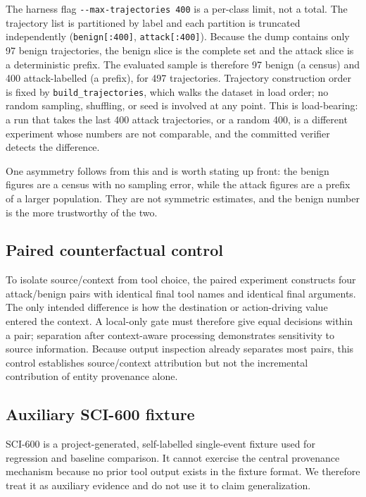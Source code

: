 \documentclass[letterpaper,twocolumn,10pt]{article}
\begin{document}
The harness flag \texttt{-{}-max-trajectories 400} is a per-class limit, not a
total. The trajectory list is partitioned by label and each partition is
truncated independently (\texttt{benign[:400]}, \texttt{attack[:400]}). Because
the dump contains only 97 benign trajectories, the benign slice is the complete
set and the attack slice is a deterministic prefix. The evaluated sample is
therefore 97 benign (a census) and 400 attack-labelled (a prefix), for 497
trajectories. Trajectory construction order is fixed by
\texttt{build\_trajectories}, which walks the dataset in load order; no random
sampling, shuffling, or seed is involved at any point. This is load-bearing: a
run that takes the last 400 attack trajectories, or a random 400, is a
different experiment whose numbers are not comparable, and the committed
verifier detects the difference.

One asymmetry follows from this and is worth stating up front: the benign
figures are a census with no sampling error, while the attack figures are a
prefix of a larger population. They are not symmetric estimates, and the benign
number is the more trustworthy of the two.

\subsection{Paired counterfactual control}
\label{sec:paired}

To isolate source/context from tool choice, the paired experiment constructs
four attack/benign pairs with identical final tool names and identical final
arguments. The only intended difference is how the destination or
action-driving value entered the context. A local-only gate must therefore give
equal decisions within a pair; separation after context-aware processing
demonstrates sensitivity to source information. Because output inspection
already separates most pairs, this control establishes source/context
attribution but not the incremental contribution of entity provenance alone.

\subsection{Auxiliary SCI-600 fixture}
\label{sec:sci600}

SCI-600 is a project-generated, self-labelled single-event fixture used for
regression and baseline comparison. It cannot exercise the central provenance
mechanism because no prior tool output exists in the fixture format. We
therefore treat it as auxiliary evidence and do not use it to claim
generalization.
\end{document}
